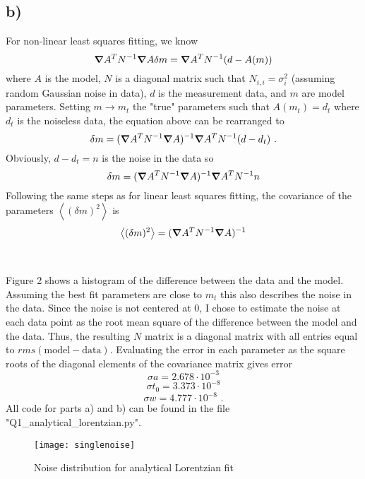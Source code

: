 \documentclass{article}
\newcommand{\<}[1]{\left\langle #1 \right\rangle }
\begin{document}
\subsection{b)}
For non-linear least squares fitting, we know
\[\grad A^T N^{-1}\grad A \delta m = \grad A^T N^{-1} (d - A(m))\]
where $A$ is the model, $N$ is a diagonal matrix such that $N_{i,i} = \sigma^2_i$ (assuming random Gaussian noise in data), $d$ is the measurement data, and $m$ are model parameters. Setting $m \to m_t$ the "true" parameters such that $A(m_t) = d_t$ where $d_t$ is the noiseless data, the equation above can be rearranged to 
\[\delta m = (\grad A^T N^{-1} \grad A)^{-1} \grad A^T N^{-1} (d-d_t) \text{ .}\]
Obviously, $d-d_t = n$ is the noise in the data so
\[\delta m = (\grad A^T N^{-1} \grad A)^{-1} \grad A^T N^{-1} n \]
Following the same steps as for linear least squares fitting, the covariance of the parameters $\<{(\delta m)^2}$ is 
\[\<{(\delta m)^2} = (\grad A^T N^{-1} \grad A)^{-1} \]\\
\\
Figure 2 shows a histogram of the difference between the data and the model. Assuming the best fit parameters are close to $m_t$ this also describes the noise in the data. Since the noise is not centered at 0, I chose to estimate the noise at each data point as the root mean square of the difference between the model and the data. Thus, the resulting $N$ matrix is a diagonal matrix with all entries equal to $rms(\text{model} - \text{data})$. Evaluating the error in each parameter as the square roots of the diagonal elements of the covariance matrix gives error
\[\sigma a = 2.678 \cdot 10^{-3}\]
\[\sigma t_0 = 3.373 \cdot 10^{-8}\]
\[\sigma w = 4.777 \cdot 10^{-8} \text{ .}\]
All code for parts a) and b) can be found in the file "Q1\_analytical\_lorentzian.py".
\begin{figure}[h]
	\caption{Noise distribution for analytical Lorentzian fit}
	\centering
	\texttt{[image: singlenoise]}
\end{figure}
\end{document}
